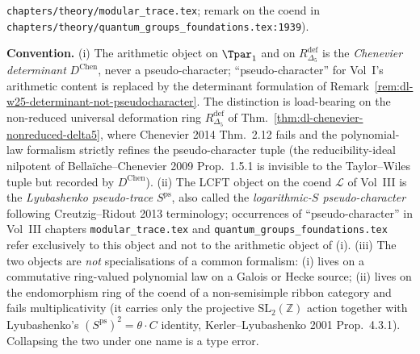 \begin{description}[itemsep=4pt, leftmargin=2.0em, style=nextline]
\begin{itemize}
 \texttt{chapters/theory/modular\_trace.tex}; remark on the coend in
 \texttt{chapters/theory/quantum\_groups\_foundations.tex:1939}).
\end{itemize}
\noindent
\textbf{Convention.}
(i) The arithmetic object on $\Tpar_1$ and on $R^{\mathrm{def}}_{\Delta_5}$ is
the \emph{Chenevier determinant} $D^{\mathrm{Chen}}$, never a
pseudo-character; ``pseudo-character'' for Vol~I's arithmetic content
is replaced by the determinant formulation of
Remark~\ref{rem:dl-w25-determinant-not-pseudocharacter}. The
distinction is load-bearing on the non-reduced universal deformation
ring $R^{\mathrm{def}}_{\Delta_5}$ of
Thm.~\ref{thm:dl-chenevier-nonreduced-delta5}, where Chenevier 2014
Thm.~2.12 fails and the polynomial-law formalism strictly refines the
pseudo-character tuple (the reducibility-ideal nilpotent of
Bellaïche--Chenevier 2009 Prop.~1.5.1 is invisible to the Taylor--Wiles
tuple but recorded by $D^{\mathrm{Chen}}$).
(ii) The LCFT object on the coend $\mathcal L$ of
Vol~III is the \emph{Lyubashenko pseudo-trace} $S^{\mathrm{ps}}$,
also called the \emph{logarithmic-$S$ pseudo-character} following
Creutzig--Ridout 2013 terminology; occurrences of
``pseudo-character'' in Vol~III chapters
\texttt{modular\_trace.tex} and
\texttt{quantum\_groups\_foundations.tex} refer exclusively to this
object and not to the arithmetic object of (i).
(iii) The two objects are \emph{not} specialisations of a common
formalism: (i) lives on a commutative ring-valued polynomial law on
a Galois or Hecke source; (ii) lives on the endomorphism ring of the
coend of a non-semisimple ribbon category and fails multiplicativity
(it carries only the projective $\mathrm{SL}_2(\mathbb Z)$ action
together with Lyubashenko's $(S^{\mathrm{ps}})^2 = \theta\cdot C$
identity, Kerler--Lyubashenko 2001 Prop.~4.3.1). Collapsing the two
under one name is a type error.


\end{description}
